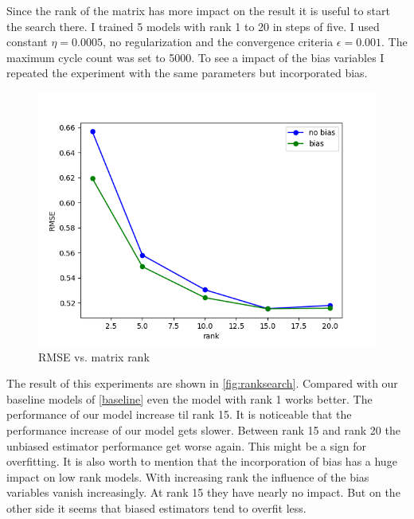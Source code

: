 \documentclass[DIV=14,twocolumn]{scrartcl}
\begin{document}
Since the rank of the matrix has more impact on the result it is useful to start the search there. I trained 5 models with rank 1 to 20 in steps of five. I used constant $\eta=0.0005$, no regularization and the convergence criteria $\epsilon = 0.001$. The maximum cycle count was set to 5000. To see a impact of the bias variables I repeated the experiment with the same parameters but incorporated bias.   
\begin{figure}[h]
	\includegraphics[width=\columnwidth]{../img/rank-rmse-validate}
	\caption{RMSE vs. matrix rank}
	\label{fig:ranksearch}
\end{figure}
The result of this experiments are shown in \autoref{fig:ranksearch}. Compared with our baseline models of \autoref{baseline} even the model with rank 1 works better. The performance of our model increase til rank 15. It is noticeable that the performance increase of our model gets slower. Between rank 15 and rank 20 the unbiased estimator performance get worse again. This might be a sign for overfitting. 
It is also worth to mention that the incorporation of bias has a huge impact on low rank models. With increasing rank the influence of the bias variables vanish increasingly. At rank 15 they have nearly no impact.
But on the other side it seems that biased estimators tend to overfit less.
\end{document}
